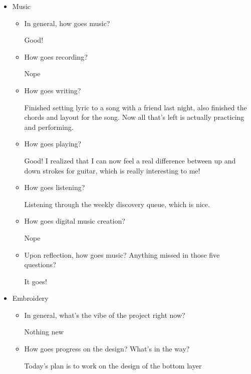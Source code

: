 \documentclass[12pt]{article}
\renewcommand{\,}{\textsuperscript{,}}
\begin{document}
\begin{itemize}
\begin{itemize}
\begin{itemize}
Eh!

\end{itemize}  
   
 \item Music  
 \begin{itemize}  
 \item In general, how goes music?

Good!

\item How goes recording?

Nope

\item How goes writing?

Finished setting lyric to a song with a friend last night, also finished the chords and layout for the song.  
Now all that's left is actually practicing and performing.

\item How goes playing?

Good! I realized that I can now feel a real difference between up and down strokes for guitar, which is really interesting to me!

\item How goes listening?

Listening through the weekly discovery queue, which is nice.

\item How goes digital music creation?

Nope

\item Upon reflection, how goes music? Anything missed in those five questions?

It goes!

\end{itemize}  
   
 \item Embroidery  
 \begin{itemize}

 \item In general, what's the vibe of the project right now?

Nothing new  
   
 \item How goes progress on the design? What's in the way?

Today's plan is to work on the design of the bottom layer  
   

\end{itemize}
\end{itemize}
\end{itemize}
\end{document}
